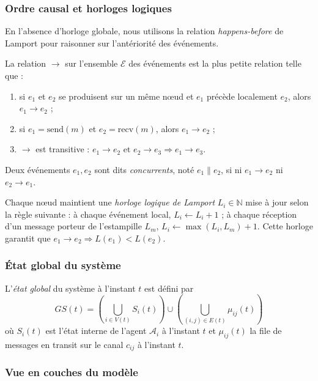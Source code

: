 \subsubsection{Ordre causal et horloges logiques}

En l'absence d'horloge globale, nous utilisons la relation \emph{happens-before} de Lamport pour raisonner sur l'antériorité des événements.

\begin{definition}
La relation $\to$ sur l'ensemble $\mathcal{E}$ des événements est la plus petite relation telle que :
\begin{enumerate}
    \item[\textbf{(i)}] si $e_1$ et $e_2$ se produisent sur un même nœud et $e_1$ précède localement $e_2$, alors $e_1 \to e_2$ ;
    \item[\textbf{(ii)}] si $e_1 = \mathrm{send}(m)$ et $e_2 = \mathrm{recv}(m)$, alors $e_1 \to e_2$ ;
    \item[\textbf{(iii)}] $\to$ est transitive : $e_1 \to e_2 \text{ et } e_2 \to e_3 \Rightarrow e_1 \to e_3$.
\end{enumerate}
Deux événements $e_1, e_2$ sont dits \emph{concurrents}, noté $e_1 \parallel e_2$, si ni $e_1 \to e_2$ ni $e_2 \to e_1$.
\end{definition}

Chaque nœud maintient une \emph{horloge logique de Lamport} $L_i \in \mathbb{N}$ mise à jour selon la règle suivante : à chaque événement local, $L_i \leftarrow L_i + 1$ ; à chaque réception d'un message porteur de l'estampille $L_m$, $L_i \leftarrow \max(L_i, L_m) + 1$. Cette horloge garantit que $e_1 \to e_2 \Rightarrow L(e_1) < L(e_2)$.

\subsubsection{État global du système}

\begin{definition}
L'\emph{état global} du système à l'instant $t$ est défini par
\[
GS(t) = \left( \bigcup_{i \in V(t)} S_i(t) \right) \cup \left( \bigcup_{(i,j) \in E(t)} \mu_{ij}(t) \right)
\]
où $S_i(t)$ est l'état interne de l'agent $\mathcal{A}_i$ à l'instant $t$ et $\mu_{ij}(t)$ la file de messages en transit sur le canal $c_{ij}$ à l'instant $t$.
\end{definition}

\subsubsection{Vue en couches du modèle}

